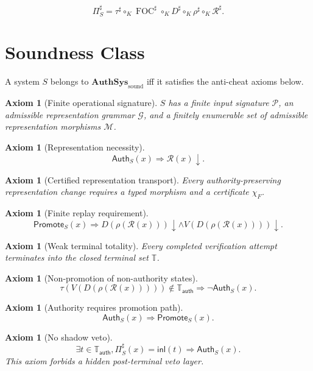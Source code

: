 \documentclass[11pt]{article}
\newtheorem{axiom}[theorem]{Axiom}
\begin{document}
\[
\boxed{
\Pi_S^\sharp
=
\tau^\sharp\circ_K \operatorname{FOC}^\sharp\circ_K D^\sharp\circ_K \rho^\sharp\circ_K \mathcal R^\sharp.
}
\]

\section{Soundness Class}

A system \(S\) belongs to \(\mathbf{AuthSys}_{\mathrm{sound}}\) iff it satisfies the anti-cheat axioms below.

\begin{axiom}[Finite operational signature]
\(S\) has a finite input signature \(\mathcal P\), an admissible representation grammar \(\mathcal G\), and a finitely enumerable set of admissible representation morphisms \(\mathcal M\).
\end{axiom}

\begin{axiom}[Representation necessity]
\[
\boxed{
\mathsf{Auth}_S(x)\Rightarrow\mathcal R(x)\downarrow.
}
\]
\end{axiom}

\begin{axiom}[Certified representation transport]
Every authority-preserving representation change requires a typed morphism and a certificate \(\chi_F\).
\end{axiom}

\begin{axiom}[Finite replay requirement]
\[
\boxed{
\mathsf{Promote}_S(x)
\Rightarrow
D(\rho(\mathcal R(x)))\downarrow
\wedge
V(D(\rho(\mathcal R(x))))\downarrow.
}
\]
\end{axiom}

\begin{axiom}[Weak terminal totality]
Every completed verification attempt terminates into the closed terminal set \(\mathbb T\).
\end{axiom}

\begin{axiom}[Non-promotion of non-authority states]
\[
\boxed{
\tau(V(D(\rho(\mathcal R(x)))))\notin\mathbb T_{\mathsf{auth}}
\Rightarrow
\neg\mathsf{Auth}_S(x).
}
\]
\end{axiom}

\begin{axiom}[Authority requires promotion path]
\[
\boxed{
\mathsf{Auth}_S(x)\Rightarrow\mathsf{Promote}_S(x).
}
\]
\end{axiom}

\begin{axiom}[No shadow veto]
\[
\boxed{
\exists t\in\mathbb T_{\mathsf{auth}},
\Pi_S^\sharp(x)=\mathsf{inl}(t)
\Rightarrow
\mathsf{Auth}_S(x).
}
\]
This axiom forbids a hidden post-terminal veto layer.
\end{axiom}
\end{document}
